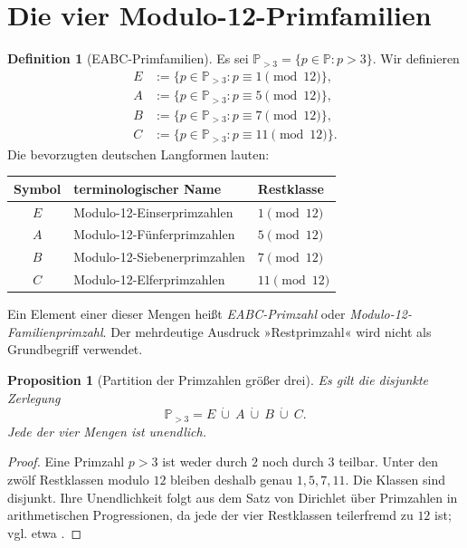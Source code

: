 \documentclass[11pt,a4paper,reqno]{amsart}
\newtheorem{proposition}[theorem]{Proposition}
\theoremstyle{definition}
\newtheorem{definition}[theorem]{Definition}
\theoremstyle{remark}
\newcommand{\Pset}{\mathbb{P}}
\newcommand{\dotcupsmall}{\mathbin{\dot\cup}}
\begin{document}
\section{Die vier Modulo-12-Primfamilien}

\begin{definition}[EABC-Primfamilien]
Es sei $\Pset_{>3}=\{p\in\Pset:p>3\}$. Wir definieren
\begin{align*}
E&:=\{p\in\Pset_{>3}:p\equiv 1\pmod{12}\},\\
A&:=\{p\in\Pset_{>3}:p\equiv 5\pmod{12}\},\\
B&:=\{p\in\Pset_{>3}:p\equiv 7\pmod{12}\},\\
C&:=\{p\in\Pset_{>3}:p\equiv 11\pmod{12}\}.
\end{align*}
Die bevorzugten deutschen Langformen lauten:
\begin{center}
\begin{tabular}{cll}
\toprule
Symbol & terminologischer Name & Restklasse \\
\midrule
$E$ & Modulo-12-Einserprimzahlen & $1\pmod{12}$ \\
$A$ & Modulo-12-Fünferprimzahlen & $5\pmod{12}$ \\
$B$ & Modulo-12-Siebenerprimzahlen & $7\pmod{12}$ \\
$C$ & Modulo-12-Elferprimzahlen & $11\pmod{12}$ \\
\bottomrule
\end{tabular}
\end{center}
Ein Element einer dieser Mengen heißt \emph{EABC-Primzahl} oder \emph{Modulo-12-Familienprimzahl}. Der mehrdeutige Ausdruck »Restprimzahl« wird nicht als Grundbegriff verwendet.
\end{definition}

\begin{proposition}[Partition der Primzahlen größer drei]
Es gilt die disjunkte Zerlegung
\[
\Pset_{>3}=E\ \dotcupsmall\ A\ \dotcupsmall\ B\ \dotcupsmall\ C.
\]
Jede der vier Mengen ist unendlich.
\end{proposition}

\begin{proof}
Eine Primzahl $p>3$ ist weder durch $2$ noch durch $3$ teilbar. Unter den zwölf Restklassen modulo $12$ bleiben deshalb genau $1,5,7,11$. Die Klassen sind disjunkt. Ihre Unendlichkeit folgt aus dem Satz von Dirichlet über Primzahlen in arithmetischen Progressionen, da jede der vier Restklassen teilerfremd zu $12$ ist; vgl. etwa \cite{Davenport,Niven}.
\end{proof}
\end{document}
